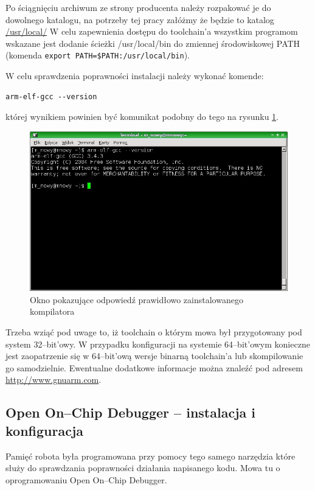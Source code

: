 Po ściągnięciu archiwum ze strony producenta należy rozpakować je do dowolnego katalogu, na potrzeby tej pracy załóżmy że będzie to katalog \url{/usr/local/} W celu zapewnienia dostępu do toolchain'a wszystkim programom wskazane jest dodanie ścieżki /usr/local/bin do zmiennej środowiskowej PATH (komenda \verb|export PATH=$PATH:/usr/local/bin|).

W celu sprawdzenia poprawności instalacji należy wykonać komende: 
\begin{verbatim}
arm-elf-gcc --version 
\end{verbatim}
której wynikiem powinien być komunikat podobny do tego na rysunku \ref{fig:arm-elf-gcc-test}.

\begin{figure}
 \centering
 \includegraphics[width=150.0mm]{../images/arm-elf-gcc-test.jpg}
 \caption{Okno pokazujące odpowiedź prawidłowo zainstalowanego kompilatora}
 \label{fig:arm-elf-gcc-test}
\end{figure}

Trzeba wziąć pod uwage to, iż toolchain o którym mowa był przygotowany pod system 32--bit'owy. W przypadku konfiguracji na systemie 64--bit'owym konieczne jest zaopatrzenie się w 64--bit'ową wersje binarną toolchain'a lub skompilowanie go samodzielnie. Ewentualne dodatkowe informacje można znaleźć pod adresem \url{http://www.gnuarm.com}.

\subsection{Open On--Chip Debugger -- instalacja i konfiguracja}
\label{roz:opendocd-install}
Pamięć robota była programowana przy pomocy tego samego narzędzia które służy do sprawdzania poprawności działania napisanego kodu. Mowa tu o oprogramowaniu Open On--Chip Debugger.

